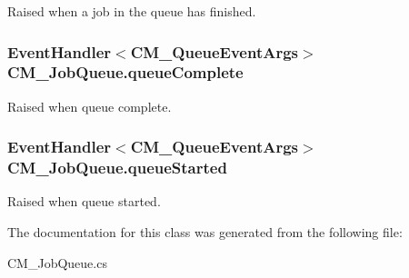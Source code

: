 Raised when a job in the queue has finished. 

\hypertarget{class_c_m___job_queue_a66eb2a7f16850398ae06ddf02372f64e}{}
\subsubsection[{queue\+Complete}]{\setlength{\rightskip}{0pt plus 5cm}Event\+Handler$<${\bf C\+M\+\_\+\+Queue\+Event\+Args}$>$ C\+M\+\_\+\+Job\+Queue.\+queue\+Complete\hspace{0.3cm}{\ttfamily [protected]}}\label{class_c_m___job_queue_a66eb2a7f16850398ae06ddf02372f64e}


Raised when queue complete. 

\hypertarget{class_c_m___job_queue_a758ae5902e82e8690264d2f7a61f9ae0}{}
\subsubsection[{queue\+Started}]{\setlength{\rightskip}{0pt plus 5cm}Event\+Handler$<${\bf C\+M\+\_\+\+Queue\+Event\+Args}$>$ C\+M\+\_\+\+Job\+Queue.\+queue\+Started\hspace{0.3cm}{\ttfamily [protected]}}\label{class_c_m___job_queue_a758ae5902e82e8690264d2f7a61f9ae0}


Raised when queue started. 



The documentation for this class was generated from the following file\+:\begin{DoxyCompactItemize}
\item 
C\+M\+\_\+\+Job\+Queue.\+cs\end{DoxyCompactItemize}
